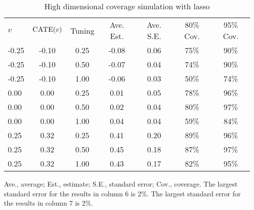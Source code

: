 \begin{table}[H]
\centering
  \begin{threeparttable}
    \caption{High dimensional coverage simulation with lasso}
     \begin{tabular}{lcccccc}
       $v$& $\textsc{CATE}(v)$ & Tuning &  Ave. Est. & Ave. S.E. &  80\% Cov. & 95\% Cov. \\[5pt]
-0.25 & -0.10 & 0.25 & -0.08 & 0.06 &  75\% & 90\% \\
-0.25 & -0.10 & 0.50 & -0.07 & 0.04  & 74\% & 90\% \\
-0.25 & -0.10 & 1.00 & -0.06 & 0.03  & 50\% & 74\% \\
0.00 & 0.00 & 0.25 & 0.01 & 0.05 &  78\% & 96\% \\
0.00 & 0.00 & 0.50 & 0.02 & 0.04  & 80\% & 97\% \\
0.00 & 0.00 & 1.00 & 0.04 & 0.04  & 59\% & 84\% \\
0.25 & 0.32 & 0.25 & 0.41 & 0.20 &  89\% & 96\% \\
0.25 & 0.32 & 0.50 & 0.45 & 0.18  & 87\% & 97\% \\
0.25 & 0.32 & 1.00 & 0.43 & 0.17  & 82\% & 95\% 
     \end{tabular}
     \label{tab:lasso_high}
    \begin{tablenotes}
      \small
      \item Ave., average; Est., estimate; S.E., standard error; Cov., coverage. The largest standard error for the results in column 6 is 2\%. The largest standard error for the results in column 7 is 2\%.
    \end{tablenotes}
  \end{threeparttable}
\end{table}